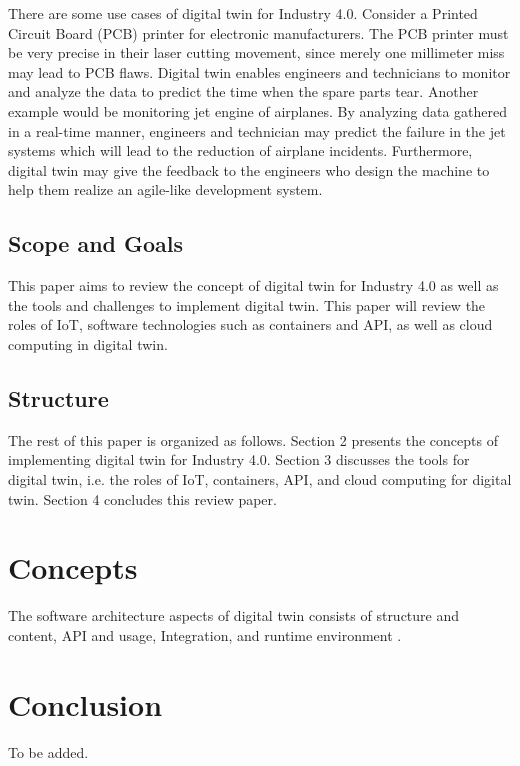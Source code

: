 \documentclass[article]{aaltoseries}
\begin{document}
There are some use cases of digital twin for Industry 4.0. Consider a Printed Circuit Board (PCB) printer for electronic manufacturers. The PCB printer must be very precise in their laser cutting movement, since merely one millimeter miss may lead to PCB flaws. Digital twin enables engineers and technicians to monitor and analyze the data to predict the time when the spare parts tear. Another example would be monitoring jet engine of airplanes. By analyzing data gathered in a real-time manner, engineers and technician may predict the failure in the jet systems which will lead to the reduction of airplane incidents. Furthermore, digital twin may give the feedback to the engineers who design the machine to help them realize an agile-like development system.

\subsection{Scope and Goals}
\label{sec:emphasis}
This paper aims to review the concept of digital twin for Industry 4.0 as well as the tools and challenges to implement digital twin. This paper will review the roles of IoT, software technologies such as containers and API, as well as cloud computing in digital twin.

\subsection{Structure}
\label{sec:em}
The rest of this paper is organized as follows. Section 2 presents the concepts of implementing digital twin for Industry 4.0. Section 3 discusses the tools for digital twin, i.e. the roles of IoT, containers, API, and cloud computing for digital twin. Section 4 concludes this review paper.
 






\section{Concepts}
The software architecture aspects of digital twin consists of structure and content, API and usage, Integration, and runtime environment \cite{malakuti2018architectural}.




\section{Conclusion}

To be added.






\end{document}
